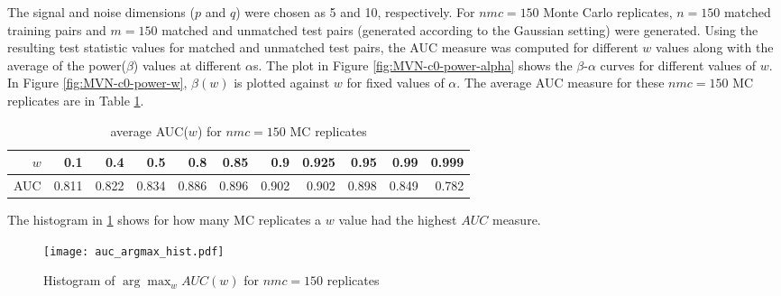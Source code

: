\documentclass[11pt]{article} %
\begin{document}

	


The signal  and noise dimensions ($p$ and $q$) were chosen as 5 and 10, respectively.  For $nmc=150$ Monte Carlo replicates,  $n=150$ matched training pairs and $m=150$ matched and unmatched test pairs (generated according to the Gaussian setting) were generated. Using the resulting test statistic values for matched and unmatched test pairs, the AUC measure was computed for different $w$ values along with the average of the power($\beta$) values at  different $\alpha$s. The plot in Figure \ref{fig:MVN-c0-power-alpha} shows the  $\beta$-$\alpha$ curves for different values of  $w$. In Figure
 \ref{fig:MVN-c0-power-w},  $\beta(w)$ is plotted against $w$ for fixed values of $\alpha$.  
The average AUC measure for these $nmc=150$ MC replicates are  in  Table \ref{tab:AUCW}.

\begin{table}[h]
\centering
\begin{tabular}{rrrrrrrrrrr}
  \hline
$w$ & 0.1 & 0.4 & 0.5 & 0.8 & 0.85 & 0.9 & 0.925 & 0.95 & 0.99 & 0.999 \\ 
  \hline
AUC & 0.811 & 0.822 & 0.834 & 0.886 & 0.896 & 0.902 & 0.902 & 0.898 & 0.849 & 0.782 \\ 
   \hline
\end{tabular}
\caption{average AUC($w$) for $nmc=150$ MC replicates}
	\label{tab:AUCW}
\end{table}


The histogram in 	\ref{fig:ArgMaxWAUCW} shows   for how many  MC replicates a  $w$ value had the highest $AUC$ measure.
\begin{figure}[h]
	\centering
	
		\texttt{[image: auc\_argmax\_hist.pdf]}
	
	\caption{Histogram of $\arg\max_w AUC(w)$ for $nmc=150$ replicates}
	\label{fig:ArgMaxWAUCW}
\end{figure}


\end{document}
